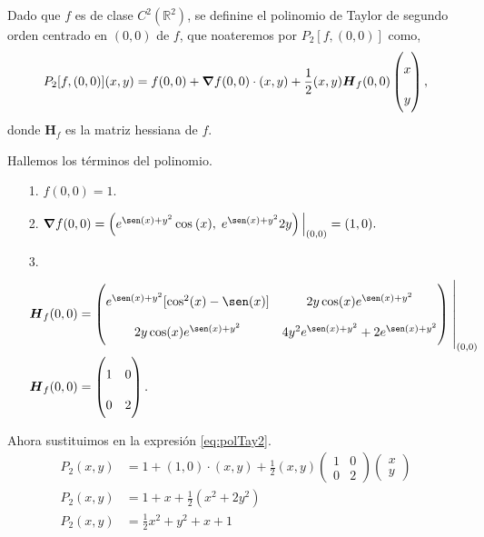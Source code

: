 \begin{solution}
    Dado que $f$ es de clase  $C^2(\mathbb{R}^2)$,  se definine  el polinomio de Taylor de segundo orden centrado en $(0,0)$ de $f$, que noateremos por $P_2[f,(0,0)]$ como,
    \begin{equation}
        P_2[f,(0,0)](x,y)=f(0,0)+\grad f(0,0)\cdot(x,y)+\frac{1}{2}(x,y)\boldsymbol{H}_f(0,0)\begin{pmatrix}x\\y\end{pmatrix}, \label{eq:polTay2}
    \end{equation}
    donde $\boldsymbol{H}_f$ es la matriz hessiana de $f$.

    Hallemos los  términos del polinomio.

    \begin{itemize}
        \item[1.] $f(0,0)=1.$
        \item[2.] $ \grad f(0,0) = \left(e^{\sen(x)+y^2}\cos\:(x),\;e^{\sen(x)+y^2}2y\right)\Big\rvert_{(0,0)}=(1,0).$
        \item[3.] \begin{align*}
                  \boldsymbol{H}_f(0,0) & =\left(
                  \renewcommand{\arraystretch}{2} %
                  \begin{matrix}
                      e^{\sen(x)+y^2}[\cos^2(x)-\sen(x)] & 2y\cos(x)e^{\sen(x)+y^2}             \\
                      2y\cos(x)e^{\sen(x)+y^2}           & 4y^2e^{\sen(x)+y^2}+2e^{\sen(x)+y^2}
                  \end{matrix}\right)\left.\rule{0pt}{1.1cm}\right\rvert_{(0,0)} \\
                  \boldsymbol{H}_f(0,0) & =\left(\begin{matrix}
                                                         1 & 0 \\0&2
                                                     \end{matrix}\right).
              \end{align*}
    \end{itemize}

    Ahora sustituimos en la expresión \eqref{eq:polTay2}.
    \begin{align*}
        P_2(x,y) & =1+(1,0)\cdot(x,y)+\frac{1}{2}(x,y)\left(\begin{matrix}1&0\\0&2\end{matrix}\right)\begin{pmatrix}x\\y\end{pmatrix} \\
        P_2(x,y) & =1+x+\frac{1}{2}(x^2+2y^2)                                                                                         \\
        P_2(x,y) & =\frac{1}{2}x^2+y^2+x+1
    \end{align*}


\end{solution}
